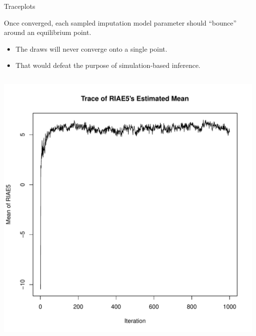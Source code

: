 \documentclass{beamer}\usepackage[]{graphicx}\usepackage[]{color}
\newenvironment{knitrout}{}{} %
\begin{document}
\watermarkoff %

\begin{frame}{Traceplots}
  
  Once converged, each sampled imputation model parameter should ``bounce'' 
  around an equilibrium point.
  \begin{itemize}
  \item The draws will never converge onto a single point.
  \item That would defeat the purpose of simulation-based inference.
  \end{itemize}
  
  \begin{columns}
    \begin{column}{0.5\textwidth}
      
\begin{knitrout}\footnotesize
{}\color{fgcolor}

{\centering \includegraphics[width=0.95\linewidth]{figure/unnamed-chunk-1-1} 

}



\end{knitrout}

\end{column}


\end{columns}
\end{frame}
\end{document}
